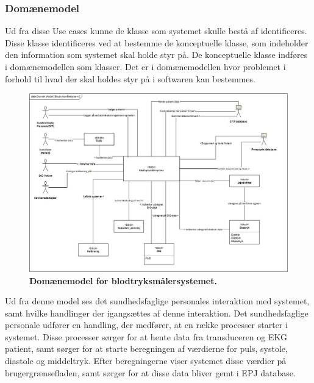 \subsubsection{Domænemodel} 
Ud fra disse Use cases kunne de klasse som systemet skulle bestå af identificeres. Disse klasse identificeres ved at bestemme de konceptuelle klasse, som indeholder den information som systemet skal holde styr på. De konceptuelle klasse indføres i domænemodellen som klasser. Det er i domænemodellen hvor problemet i forhold til hvad der skal holdes styr på i softwaren kan bestemmes. 
\begin{figure}[H]
\includegraphics[width =1.0\textwidth , center]{billeder/DM}
\caption{\textbf{Domænemodel for blodtryksmålersystemet.}}
\end{figure}
Ud fra denne model ses det sundhedsfaglige personales interaktion med systemet, samt hvilke handlinger der igangsættes af denne interaktion. Det sundhedsfaglige personale udfører en handling, der medfører, at en række processer starter i systemet. Disse processer sørger for
at hente data fra transduceren og EKG patient, samt sørger for at starte beregningen af værdierne for puls,
systole, diastole og middeltryk. Efter beregningerne viser systemet disse værdier på brugergrænsefladen, samt sørger for at disse data bliver gemt i EPJ database. 
